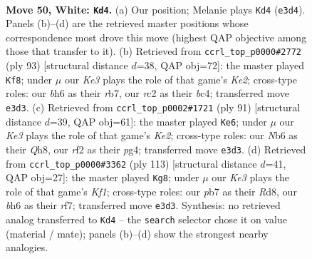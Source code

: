 \documentclass[11pt]{article}
\begin{document}
\clearpage

\begin{figure}[p]\centering
\begin{subfigure}{0.46\textwidth}\centering
\resizebox{\linewidth}{!}{%
\newchessgame
\chessboard[
  setfen={3R4/1p5k/1N4pb/5p1p/P7/4K1PP/2r2r2/8 w - - 2 50},
  showmover=false,
  pgfstyle=straightmove, color=movearrow, markmove={e3-d4}
]}
\caption{}
\end{subfigure}\hfill
\begin{subfigure}{0.46\textwidth}\centering
\resizebox{\linewidth}{!}{%
\newchessgame
\chessboard[
  setfen={8/1R2k2p/2K3p1/6P1/2B2r2/1P4n1/P3p3/8 b - - 1 47},
  showmover=false,
  pgfstyle=straightmove, color=movearrow, markmove={e7-f8}
]}
\caption{}
\end{subfigure}
\\[4pt]
\begin{subfigure}{0.46\textwidth}\centering
\resizebox{\linewidth}{!}{%
\newchessgame
\chessboard[
  setfen={7q/4kp2/8/2p3B1/1p2P1Pr/1P3K2/2P5/3R1R2 b - - 0 46},
  showmover=false,
  pgfstyle=straightmove, color=movearrow, markmove={e7-e6}
]}
\caption{}
\end{subfigure}\hfill
\begin{subfigure}{0.46\textwidth}\centering
\resizebox{\linewidth}{!}{%
\newchessgame
\chessboard[
  setfen={3r1k2/5R1R/5pp1/8/1p3P2/2r2P1P/3p1KP1/8 b - - 5 57},
  showmover=false,
  pgfstyle=straightmove, color=movearrow, markmove={f8-g8}
]}
\caption{}
\end{subfigure}
\caption{\textbf{Move 50, White: \texttt{Kd4}.} (a) Our position; Melanie plays \texttt{Kd4} (\texttt{e3d4}). Panels (b)--(d) are the retrieved master positions whose correspondence most drove this move (highest QAP objective among those that transfer to it). (b) Retrieved from \texttt{ccrl\_top\_p0000\#2772} (ply 93) [structural distance $d$=38, QAP obj=72]: the master played \texttt{Kf8}; under $\mu$ our \emph{Ke3} plays the role of that game's \emph{Ke2}; cross-type roles: our \emph{b}h6 as their \emph{r}b7, our \emph{r}c2 as their \emph{b}c4; transferred move \texttt{e3d3}. (c) Retrieved from \texttt{ccrl\_top\_p0002\#1721} (ply 91) [structural distance $d$=39, QAP obj=61]: the master played \texttt{Ke6}; under $\mu$ our \emph{Ke3} plays the role of that game's \emph{Ke2}; cross-type roles: our \emph{N}b6 as their \emph{Q}h8, our \emph{r}f2 as their \emph{p}g4; transferred move \texttt{e3d3}. (d) Retrieved from \texttt{ccrl\_top\_p0000\#3362} (ply 113) [structural distance $d$=41, QAP obj=27]: the master played \texttt{Kg8}; under $\mu$ our \emph{Ke3} plays the role of that game's \emph{Kf1}; cross-type roles: our \emph{p}b7 as their \emph{R}d8, our \emph{b}h6 as their \emph{r}f7; transferred move \texttt{e3d3}. Synthesis: no retrieved analog transferred to \texttt{Kd4} -- the \texttt{search} selector chose it on value (material / mate); panels (b)--(d) show the strongest nearby analogies.}
\label{fig:thought-m98}
\end{figure}
\end{document}
